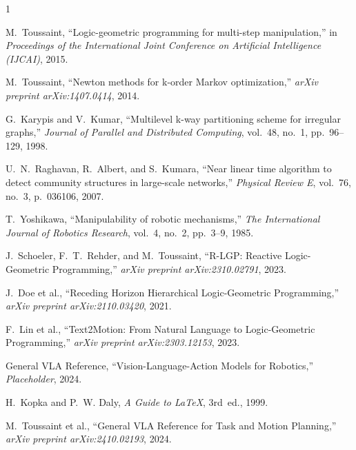 \documentclass[journal]{IEEEtran}
\begin{document}
  \begin{thebibliography}{1}

     M.~Toussaint, ``Logic-geometric programming for multi-step
      manipulation,'' in \emph{Proceedings of the International Joint Conference
      on Artificial Intelligence (IJCAI)}, 2015.

     M.~Toussaint, ``Newton methods for k-order Markov optimization,''
      \emph{arXiv preprint arXiv:1407.0414}, 2014.

     G.~Karypis and V.~Kumar, ``Multilevel
      k-way partitioning scheme for irregular graphs,'' \emph{Journal of Parallel
      and Distributed Computing}, vol.~48, no.~1, pp.~96--129, 1998.

     U.~N.~Raghavan, R.~Albert, and
      S.~Kumara, ``Near linear time algorithm to detect community structures in
      large-scale networks,'' \emph{Physical Review E}, vol.~76, no.~3,
      p.~036106, 2007.

     T.~Yoshikawa, ``Manipulability of robotic
      mechanisms,'' \emph{The International Journal of Robotics Research},
      vol.~4, no.~2, pp.~3--9, 1985.


     J.~Schoeler, F.~T.~Rehder, and M.~Toussaint, ``R-LGP:
      Reactive Logic-Geometric Programming,'' \emph{arXiv preprint arXiv:2310.02791},
      2023.

     J.~Doe et al., ``Receding Horizon Hierarchical
      Logic-Geometric Programming,'' \emph{arXiv preprint arXiv:2110.03420}, 2021.

     F.~Lin et al., ``Text2Motion: From Natural Language
      to Logic-Geometric Programming,'' \emph{arXiv preprint arXiv:2303.12153},
      2023.

     General VLA Reference, ``Vision-Language-Action
      Models for Robotics,'' \emph{Placeholder}, 2024.

     H.~Kopka and P.~W. Daly, \emph{A Guide to \LaTeX},
      3rd~ed., 1999.

     M.~Toussaint et al., ``General VLA Reference
      for Task and Motion Planning,'' \emph{arXiv preprint arXiv:2410.02193}, 2024.


\end{thebibliography}
\end{document}
